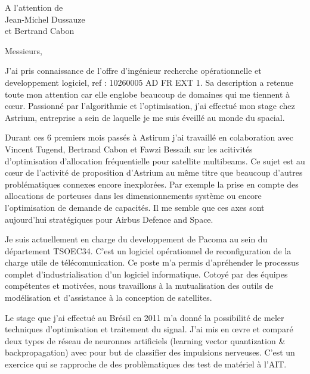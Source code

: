 \documentclass[12pt]{lettre}
\begin{document}
\begin{letter}{A l'attention de\\Jean-Michel Dussauze\\et Bertrand Cabon}
\address{Victor Cameo Ponz\\16 rue Payras\\31000 Toulouse}
\nofax

\opening{Messieurs,}
{%
J'ai pris connaissance de l'offre d'ingénieur recherche opérationnelle et
developpement logiciel, ref : 10260005 AD FR EXT 1.
Sa description a retenue toute mon attention car elle englobe beaucoup de
domaines qui me tiennent à c\oe{}ur.
Passionné par l'algorithmie et l'optimisation, j'ai effectué mon stage
chez Astrium, entreprise a sein de laquelle je me suis éveillé au monde du spacial.
}

{%
Durant ces 6 premiers mois passés à Astirum j'ai travaillé en colaboration
avec Vincent Tugend, Bertrand Cabon et Fawzi Bessaih sur les acitivités
d'optimisation d'allocation fréquentielle pour satellite multibeams.
Ce sujet est au cœur de l'activité de proposition d'Astrium
au même titre que beaucoup d'autres problématiques connexes encore inexplorées.
Par exemple la prise en compte des allocations de porteuses dans les
dimensionnements système ou encore l'optimisation de demande de capacités.
Il me semble que ces axes sont aujourd'hui stratégiques pour Airbus Defence and Space.
}

{%
Je suis actuellement en charge du developpement de Pacoma au sein
du département TSOEC34.
C'est un logiciel opérationnel de reconfiguration de la charge utile de
télécomunication.
Ce poste m'a permis d'apréhender le processus complet d'industrialisation d'un
logiciel informatique.
Cotoyé par des équipes compétentes et motivées, nous travaillons à la
mutualisation des outils de modélisation et d'assistance à la conception de
satellites.
}

{%
Le stage que j'ai effectué au Brésil en 2011 m'a donné la possibilité de meler
techniques d'optimisation et traitement du signal. J'ai mis en \oe{}vre et comparé
deux types de réseau de neuronnes artificiels (learning vector quantization \&
backpropagation) avec pour but de classifier des impulsions nerveuses.
C'est un exercice qui se rapproche de des problèmatiques
des test de matériel à l'AIT.
}


\end{letter}
\end{document}
